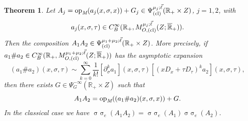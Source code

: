 \documentclass[reqno]{amsart}
\numberwithin{equation}{section}
\newtheorem{theorem}[equation]{Theorem}
\theoremstyle{definition}
\def\R{\mathbb R}
\def\opm{\textup{op}_{\textit{M}}}
\DeclareMathOperator{\sym}{ \sigma\!\!\!\sigma}
\begin{document}
\begin{theorem}\label{CompositionCalculus}
Let $A_j = \opm(a_j(x,\sigma,x)) + G_j \in \Psi^{\mu_j;\vec{\ell}}_{\textup{(cl)}}(\R_+\times Z)$, $j = 1,2$, with
$$
a_j(x,\sigma,\tau) \in C^{\infty}_B(\R_+,M^{\mu_j;\vec{\ell}}_{O,\textup{(cl)}}(Z;\overline{\R}_+)).
$$
Then the composition $A_1 A_2 \in \Psi^{\mu_1+\mu_2;\vec{\ell}}_{\textup{(cl)}}(\R_+\times Z)$. More precisely, if $a_1{\#}a_2 \in C^{\infty}_B(\R_+,M^{\mu_1+\mu_2;\vec{\ell}}_{O,\textup{(cl)}}(Z;\overline{\R}_+))$ has the asymptotic expansion
\begin{equation}\label{LeibnizAsymptotics}
(a_1{\#}a_2)(x,\sigma,\tau) \sim \sum\limits_{k=0}^{\infty}\frac{1}{k!}[\partial_{\sigma}^ka_1](x,\sigma,\tau)[(xD_x + \tau D_{\tau})^ka_2](x,\sigma,\tau),
\end{equation}
then there exists $G \in \Psi^{-\infty}_G(\R_+\times Z)$ such that
$$
A_1 A_2 = \opm((a_1{\#}a_2)(x,\sigma,x)) + G.
$$
In the classical case we have $\sym_e(A_1 A_2) = \sym_e(A_1)\sym_e(A_2)$.
\end{theorem}
\end{document}
